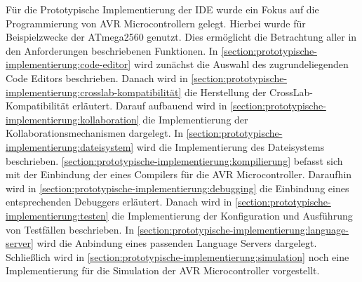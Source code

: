 Für die Prototypische Implementierung der IDE wurde ein Fokus auf die Programmierung von AVR Microcontrollern gelegt. Hierbei wurde für Beispielzwecke der ATmega2560 genutzt. Dies ermöglicht die Betrachtung aller in den Anforderungen beschriebenen Funktionen. In \autoref{section:prototypische-implementierung:code-editor} wird zunächst die Auswahl des zugrundeliegenden Code Editors beschrieben. Danach wird in \autoref{section:prototypische-implementierung:crosslab-kompatibilität} die Herstellung der CrossLab-Kompatibilität erläutert. Darauf aufbauend wird in \autoref{section:prototypische-implementierung:kollaboration} die Implementierung der Kollaborationsmechanismen dargelegt. In \autoref{section:prototypische-implementierung:dateisystem} wird die Implementierung des Dateisystems beschrieben. \autoref{section:prototypische-implementierung:kompilierung} befasst sich mit der Einbindung der eines Compilers für die AVR Microcontroller. Daraufhin wird in \autoref{section:prototypische-implementierung:debugging} die Einbindung eines entsprechenden Debuggers erläutert. Danach wird in \autoref{section:prototypische-implementierung:testen} die Implementierung der Konfiguration und Ausführung von Testfällen beschrieben. In \autoref{section:prototypische-implementierung:language-server} wird die Anbindung eines passenden Language Servers dargelegt. Schließlich wird in \autoref{section:prototypische-implementierung:simulation} noch eine Implementierung für die Simulation der AVR Microcontroller vorgestellt.









